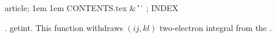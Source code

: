 


\Wbegin[;]
{article;}
{1em}
{1em}
{CONTENTS.tex}
{ %
 {\&\WRS}
 {\|}
 {\>\WUC}
 {\>\WUC}
 {\>\WUC}
 {\@}
 {\.\.}
 {\.}
 {}
}
{\M}
{;}
{INDEX}



\def\title{--- INTEGRAL STORAGE AND PROCESSING ---}





\FWEBtoc

.  getint. This function withdraws $(ij,kl)$ two-electron integral
from the .

